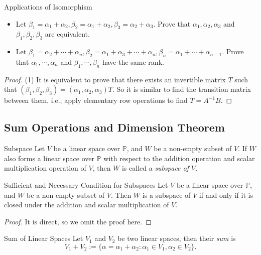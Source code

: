 \begin{example}{Applications of Isomorphism}{}
  \begin{itemize}
  \item Let $\beta_1 = \alpha_1 + \alpha_2, \beta_2 = \alpha_1 + \alpha_2,
    \beta_3 = \alpha_2 + \alpha_3$. Prove that $\alpha_1, \alpha_2, \alpha_3$
    and $\beta_1, \beta_2, \beta_3$ are equivalent.
  \item Let $\beta_1 = \alpha_2 + \cdots + \alpha_n,
    \beta_2 = \alpha_1 + \alpha_3 + \cdots + \alpha_n,
    \beta_n = \alpha_1 + \cdots + \alpha_{n-1}$.
    Prove that $\alpha_1, \cdots, \alpha_n$ and $\beta_1, \cdots, \beta_n$ have
    the same rank.
  \end{itemize}
\end{example}

\begin{proof}
  (1) It is equivalent to prove that there exists an invertible matrix $T$ such that
  $(\beta_1, \beta_2, \beta_3) = (\alpha_1, \alpha_2, \alpha_3)T$.
  So it is similar to find the transition matrix between them, i.e.,
  apply elementary row operations to find $T = A^{-1}B$.
\end{proof}

\subsection{Sum Operations and Dimension Theorem}

\begin{definition}{Subspace}{}
  Let $V$ be a linear space over $\mathbb{P}$,
  and $W$ be a non-empty subset of $V$.
  If $W$ also forms a linear space over $\mathbb{P}$ with respect to
  the addition operation and scalar multiplication operation of $V$,
  then $W$ is called a \emph{subspace of $V$}.
\end{definition}

\begin{proposition}{Sufficient and Necessary Condition for Subspaces}{}
  Let $V$ be a linear space over $\mathbb{P}$,
  and $W$ be a non-empty subset of $V$.
  Then $W$ is a subspace of $V$ if and only if
  it is closed under the addition and scalar multiplication of $V$.
\end{proposition}

\begin{proof}
  It is direct, so we omit the proof here.
\end{proof}

\begin{definition}{Sum of Linear Spaces}{}
  Let $V_1$ and $V_2$ be two linear spaces, then their \emph{sum} is
  \begin{equation}
    V_1 + V_2 := \{\alpha = \alpha_1 + \alpha_2: \alpha_1 \in V_1, \alpha_2 \in V_2\}.
  \end{equation}
\end{definition}

